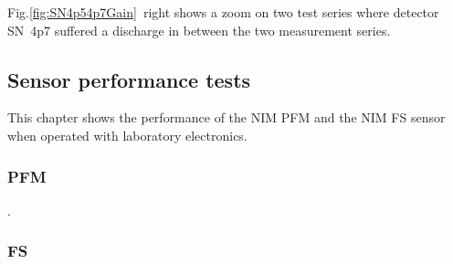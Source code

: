	
	
	
	Fig.\ref{fig:SN4p54p7Gain}~right shows a zoom on two test series where detector SN~4p7 suffered a discharge in between the two measurement series.
	
	


		
	\subsection{Sensor performance tests}
		This chapter shows the performance of the NIM PFM and the NIM FS sensor when operated with laboratory electronics.
		
		\subsubsection{PFM}
		.
		\subsubsection{FS }
	
